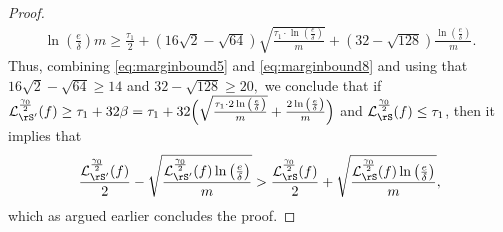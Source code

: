 \begin{proof}
\begin{align}
{{        \ln{\left(\frac{e}{\delta} \right)}}{m}}  \geq \frac{\tau_{1}}{2}+(16\sqrt{2}-\sqrt{64})\sqrt{\frac{\tau_{1}\cdot \ln{\left(\frac{e}{\delta} \right)}}{m}} 
        +(32-\sqrt{128})\frac{\ln{\left(\frac{e}{\delta} \right)}}{m}.
\end{align}
Thus, combining \cref{eq:marginbound5} and \cref{eq:marginbound8} and using that $ 16\sqrt{2}-\sqrt{64} \geq 14$ and $ 32-\sqrt{128}\geq 20,$ we conclude that if $
\ls_{\rS'}^{\frac{\gamma_{0}}{2}}(f)\geq\tau_{1}+32\beta= \tau_{1} 
+ 32\Big(\sqrt{\frac{\tau_{1}\cdot 2 \ln{\left(\frac{e}{\delta} \right)}}{m}} 
+\frac{2\ln{\left(\frac{e}{\delta} \right)}}{m}\Big) $ and $ \ls_{\rS}^{\frac{\gamma_{0}}{2}}(f)
\leq  \tau_{1}$, then it implies that 
\begin{align*}
    \frac{\ls_{\rS'}^{\frac{\gamma_{0}}{2}}(f)}{2}-
    \sqrt{\frac{
       \ls_{\rS'}^{\frac{\gamma_{0}}{2}}
        (f)\ln{\left(\frac{e}{\delta} \right)}}{m}} 
        >
        \frac{\ls_{\rS}^{\frac{\gamma_{0}}{2}}(f)}{2}+
        \sqrt{\frac{
            \ls_{\rS}^{\frac{\gamma_{0}}{2}}(f)
            \ln{\left(\frac{e}{\delta} \right)}}{m}},
        \end{align*}
which as argued earlier concludes the proof.
\end{proof}